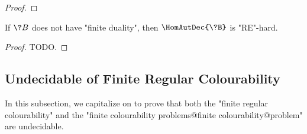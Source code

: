 \begin{proof}
\end{proof}


\begin{corollary}
	\AP\label{coro:lowerbound-homreg}
	If $\?B$ does not have "finite duality", then $\HomAutDec{\?B}$
	is "RE"-hard.
\end{corollary}

\begin{proof}
	TODO.
\end{proof}


\subsection{\AP\label{sec:undecidability-finite-colourability} Undecidable of Finite Regular Colourability}

In this subsection, we capitalize on  to 
prove that both the "finite regular colourability" and the "finite colourability problems@finite colourability@problem" are undecidable.

